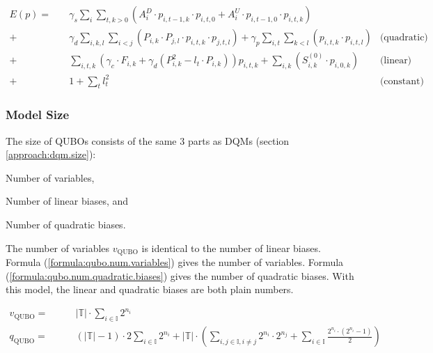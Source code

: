 \begin{align}
  E(p)
  = \quad & \gamma_s \sum_i \sum_{t, k > 0} \left(
      A_i^D \cdot p_{i, t-1, k} \cdot p_{i, t, 0}
      + A_i^U \cdot p_{i, t-1, 0} \cdot p_{i, t, k}
    \right) \\
  + \quad & \gamma_d \sum_{i, k, l} \sum_{i < j} \left(
      P_{i,k} \cdot P_{j,l} \cdot p_{i, t, k} \cdot p_{j, t, l}
    \right)
  + \gamma_p \sum_{i, t} \sum_{k < l} \left( p_{i, t, k} \cdot p_{i, t, l} \right)
  & \text{(quadratic)}
  \label{formula:qubo.result.quadratic}
  \\ + \quad &
  \sum_{i, t, k} \left(
    \gamma_c \cdot F_{i, k}
    + \gamma_d \left( P_{i, k}^2 - l_t \cdot P_{i, k} \right)
  \right) p_{i, t, k}
  + \sum_{i, k} \left( S_{i, k}^{(0)} \cdot p_{i, 0, k} \right)
  & \text{(linear)}
  \label{formula:qubo.result.linear}
  \\ + \quad &
  1 + \sum_t l_t^2
  & \text{(constant)}
  \label{formula:qubo.result.constant}
\end{align}

\subsubsection{Model Size}
\label{approach:qubo.size}

The size of QUBOs consists of the same $3$ parts as DQMs (section \ref{approach:dqm.size}):
\begin{enumerate*}[label=(\roman*)]
  \item Number of variables,
  \item Number of linear biases, and
  \item Number of quadratic biases.
\end{enumerate*}
The number of variables $v_{\text{QUBO}}$ is identical to the number of linear biases.
Formula (\ref{formula:qubo.num.variables}) gives the number of variables.
Formula (\ref{formula:qubo.num.quadratic.biases}) gives the number of quadratic biases.
With this model, the linear and quadratic biases are both plain numbers.

\begin{subequations}
\begin{align}
  \label{formula:qubo.num.variables}
  v_{\text{QUBO}} = & \qquad
  |\mathbb{T}| \cdot \sum_{i \in \mathbb{I}} 2^{n_i}
  \\
  \label{formula:qubo.num.quadratic.biases}
  q_{\text{QUBO}} = & \qquad
  \left( |\mathbb{T}| - 1 \right) \cdot 2 \sum_{i \in \mathbb{I}} 2^{n_i}
  + |\mathbb{T}| \cdot \left(
    \sum_{i, j \in \mathbb{I}, i \neq j} 2^{n_i} \cdot 2^{n_j}
    + \sum_{i \in \mathbb{I}} \frac{2^{n_i} \cdot \left( 2^{n_i} - 1 \right)}{2}
  \right)
\end{align}
\end{subequations}
